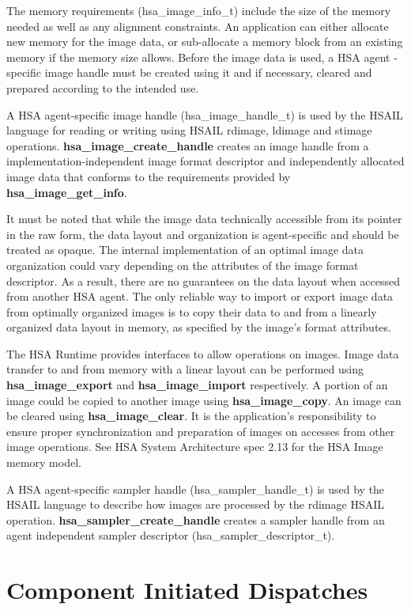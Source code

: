 \documentclass[draft]{book}
\newcommand{\reffun}[1]{\textbf{#1}}
\newcommand{\reftyp}[1]{#1}
\begin{document}
\begin{appendices}
The memory requirements (\reftyp{hsa_image_info_t}) include the size of the
memory needed as well as any alignment constraints. An application can either
allocate new memory for the image data, or sub-allocate a memory block from an
existing memory if the memory size allows. Before the image data is used, a HSA
agent -specific image handle must be created using it and if necessary, cleared
and prepared according to the intended use.

A HSA agent-specific image handle (\reftyp{hsa_image_handle_t}) is used by
the HSAIL language for reading or writing using HSAIL rdimage, ldimage and
stimage operations. \reffun{hsa_image_create_handle} creates an image handle
from a implementation-independent image format descriptor and independently
allocated image data that conforms to the requirements provided by
\reffun{hsa_image_get_info}.

It must be noted that while the image data technically accessible from its
pointer in the raw form, the data layout and organization is agent-specific and
should be treated as opaque. The internal implementation of an optimal image
data organization could vary depending on the attributes of the image format
descriptor. As a result, there are no guarantees on the data layout when
accessed from another HSA agent. The only reliable way to import or export image
data from optimally organized images is to copy their data to and from a
linearly organized data layout in memory, as specified by the image's format
attributes.

The HSA Runtime provides interfaces to allow operations on images. Image data
transfer to and from memory with a linear layout can be performed using
\reffun{hsa_image_export} and \reffun{hsa_image_import} respectively. A
portion of an image could be copied to another image using
\reffun{hsa_image_copy}. An image can be cleared using
\reffun{hsa_image_clear}. It is the application's responsibility to ensure
proper synchronization and preparation of images on accesses from other image
operations. See HSA System Architecture spec 2.13 for the HSA Image memory
model.

A HSA agent-specific sampler handle (\reftyp{hsa_sampler_handle_t}) is used
by the HSAIL language to describe how images are processed by the rdimage HSAIL
operation. \reffun{hsa_sampler_create_handle} creates a sampler handle from
an agent independent sampler descriptor (\reftyp{hsa_sampler_descriptor_t}).

\chapter{Component Initiated Dispatches} \label{architected}
\hypertarget{architectedchptr}{}


\end{appendices}
\end{document}
